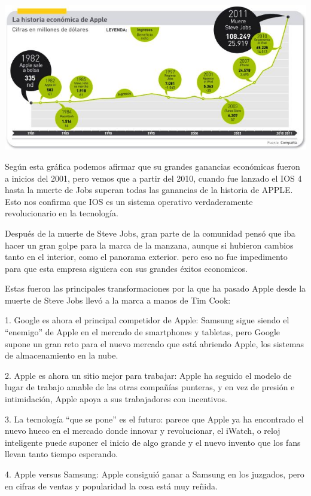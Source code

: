\includegraphics[scale=0.5]{img/cp08/img0801.png}

Según esta gráfica podemos afirmar que su grandes ganancias
económicas fueron a inicios del 2001, pero vemos que a partir
del 2010, cuando fue lanzado el IOS 4 hasta la muerte de Jobs
superan todas las ganancias de la historia de APPLE. Esto nos
confirma que IOS es un sistema operativo verdaderamente
revolucionario en la tecnología.

Después de la muerte de Steve Jobs, gran parte de la
comunidad pensó que iba hacer un gran golpe
para la marca de la manzana, aunque si
hubieron cambios tanto en el interior, como el
panorama exterior. pero eso no fue impedimento
para que esta empresa siguiera con sus grandes
éxitos economicos.

Estas fueron las principales transformaciones por la que ha
pasado Apple desde la muerte de Steve Jobs
llevó a la marca a manos de Tim Cook:

1. Google es ahora el principal competidor de Apple:
Samsung sigue siendo el “enemigo” de Apple en el mercado de
smartphones y tabletas, pero Google supone un gran reto para el
nuevo mercado que está abriendo Apple, los sistemas de
almacenamiento en la nube.

2. Apple es ahora un sitio mejor para trabajar: Apple ha
seguido el modelo de lugar de trabajo amable de las otras
compañías punteras, y en vez de presión e intimidación, Apple
apoya a sus trabajadores con incentivos.

3. La tecnología “que se pone” es el futuro: parece que
Apple ya ha encontrado el nuevo hueco en el mercado donde
innovar y revolucionar, el iWatch, o reloj inteligente puede
suponer el inicio de algo grande y el nuevo invento que los fans
llevan tanto tiempo esperando.

4. Apple versus Samsung: Apple consiguió ganar a Samsung
en los juzgados, pero en cifras de ventas y popularidad la cosa
está muy reñida.


